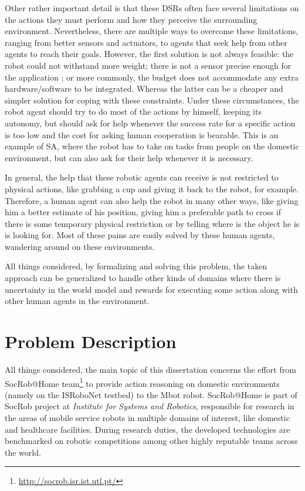 Other rather important detail is that these \glspl{DSR} often face several
limitations on the actions they must perform and how they perceive the
surrounding environment. Nevertheless, there are multiple ways to overcome these
limitations, ranging from better sensors and actuators, to agents that
seek help from other agents to reach their goals. However, the first solution is
not always feasible: the robot could not withstand more weight; there is not a
sensor precise enough for the application ; or more commonly, the budget does not
accommodate any extra hardware/software to be integrated. Whereas the latter 
can be a cheaper and simpler solution for coping with these constraints.
Under these circumstances, the robot agent should try to do most of the actions
by himself, keeping its autonomy, but should ask for help whenever the success
rate for a specific action is too low and the cost for asking human cooperation
is bearable. This is an example of \gls{SA}, where the robot has to take on
tasks from people on the domestic environment, but can also ask for their help
whenever it is necessary.\par

In general, the help that these robotic agents can receive is not restricted to
physical actions, like grabbing a cup and giving it back to the robot, for
example. Therefore, a human agent can also help the robot in many other ways,
like giving him a better estimate of his position, giving him a preferable path
to cross if there is some temporary physical restriction or by telling where is
the object he is is looking for. Most of these pains are easily solved by these
human agents, wandering around on these environments.\par

All things considered, by formalizing and solving this problem, the taken
approach can be generalized to handle other kinds of domains where there is
uncertainty in the world model and rewards for executing some action along with
other human agents in the environment.

\section{Problem Description}

All things considered, the main topic of this dissertation concerns the effort
from SocRob@Home team\footnote{\url{http://socrob.isr.ist.utl.pt/}} to provide
action reasoning on domestic environments (namely on the ISRoboNet testbed)
to the Mbot robot. SocRob@Home is part of SocRob project at \textit{Institute 
for Systems and Robotics}, responsible for research in the areas of mobile service 
robots in multiple domains of interest, like domestic and healthcare facilities. During
research duties, the developed technologies are benchmarked on robotic competitions
among other highly reputable teams across the world.

